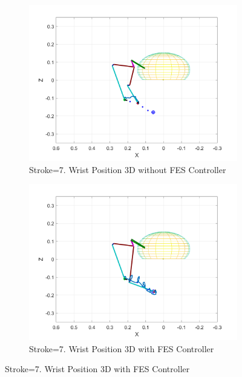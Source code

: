 \begin{landscape}
\begin{figure}[ht]
        \begin{subfigure}[b]{0.33\textwidth}
            \centering
            \includegraphics[width=\linewidth]{Pictures/Results/Controller/Stroke7/6_wp_nofes.png}
            \caption{Stroke=7. Wrist Position 3D without FES Controller}
        \end{subfigure}%
        \hfill
        \begin{subfigure}[b]{0.33\textwidth}
            \centering
            \includegraphics[width=\linewidth]{Pictures/Results/Controller/Stroke7/6_wp_fes.png}
            \caption{Stroke=7. Wrist Position 3D with FES Controller}
        \end{subfigure}
        \hfill

\end{figure}
\end{landscape}
